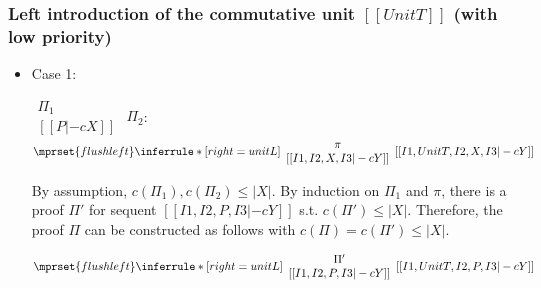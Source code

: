 \subsubsection{Left introduction of the commutative unit $[[UnitT]]$ (with low priority)}
\begin{itemize}
\item Case 1:
      \begin{center}
        \scriptsize
        \begin{math}
          \begin{array}{c}
            \Pi_1 \\
            {[[P |-c X]]}
          \end{array}
        \end{math}
        \qquad\qquad
        $\Pi_2$:
        \begin{math}
          $$\mprset{flushleft}
          \inferrule* [right={\tiny unitL}] {
            {
              \begin{array}{c}
                \pi \\
                {[[I1, I2, X, I3 |-c Y]]}
              \end{array}
            }
          }{[[I1, UnitT, I2, X, I3 |-c Y]]}
        \end{math}
      \end{center}
      By assumption, $c(\Pi_1),c(\Pi_2)\leq |X|$. By induction on $\Pi_1$
      and $\pi$, there is a proof $\Pi'$ for sequent
      $[[I1, I2, P, I3 |-c Y]]$
      s.t. $c(\Pi') \leq |X|$. Therefore, the proof $\Pi$ can be
      constructed as follows with $c(\Pi) = c(\Pi') \leq |X|$.
      \begin{center}
        \scriptsize
        \begin{math}
          $$\mprset{flushleft}
          \inferrule* [right={\tiny unitL}] {
            {
              \begin{array}{c}
                \Pi' \\
                {[[I1, I2, P, I3 |-c Y]]}
              \end{array}
            }
          }{[[I1, UnitT, I2, P, I3 |-c Y]]}
        \end{math}
      \end{center}


\end{itemize}
